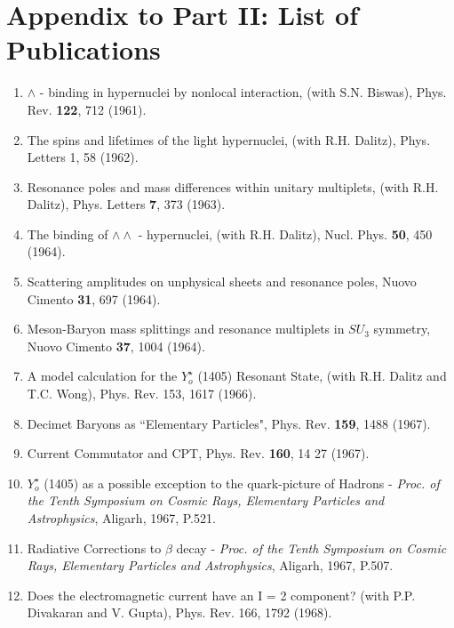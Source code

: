 \chapter{Appendix to Part II: List of Publications}
\begin{enumerate}
\item $\wedge$ - binding in hypernuclei by nonlocal interaction, (with
S.N. Biswas),  Phys. Rev. {\bf 122}, 712 (1961). 

\item The spins and lifetimes of the light hypernuclei, (with R.H.
Dalitz), Phys. Letters {1}, 58 (1962).

\item Resonance poles and mass differences within unitary multiplets,
(with R.H. Dalitz), Phys. Letters {\bf 7}, 373 (1963).

\item The binding of $\wedge \wedge$ - hypernuclei, (with R.H. Dalitz),
Nucl. Phys. {\bf 50}, 450 (1964).

\item Scattering amplitudes on unphysical sheets and resonance poles,
Nuovo Cimento {\bf 31}, 697 (1964).

\item Meson-Baryon mass splittings and resonance multiplets in $SU_3$
symmetry, Nuovo Cimento {\bf 37}, 1004 (1964).

\item A model calculation for the $Y^\star_o$ (1405) Resonant State,
(with R.H. Dalitz and T.C. Wong), Phys. Rev. 153, 1617 (1966).

\item Decimet Baryons as ``Elementary Particles", Phys. Rev. {\bf
159}, 1488 (1967).

\item Current Commutator and CPT, Phys. Rev. {\bf 160}, 14 27 (1967).

\item $Y^\star_o$ (1405) as a possible exception to the quark-picture of
Hadrons - {\it Proc. of the Tenth Symposium on Cosmic Rays, Elementary
Particles and Astrophysics}, Aligarh, 1967, P.521.

\item Radiative Corrections to $\beta$ decay - {\it Proc. of the Tenth
Symposium on Cosmic Rays, Elementary Particles and Astrophysics},
Aligarh, 1967, P.507.

\item Does the electromagnetic current have an I = 2 component? (with
P.P. Divakaran and V. Gupta), Phys. Rev. 166, 1792 (1968).


\end{enumerate}
